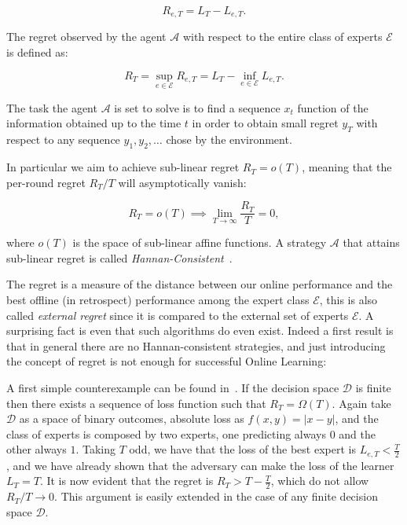 \begin{equation}\label{def:Regret}
	R_{e,T} = L_T-L_{e,T}.
\end{equation}

The regret observed by the agent $\mathcal A$ with respect to the entire class of experts $\mathcal E$ is defined as:

\begin{equation}
	R_T=\sup\limits_{e\in\mathcal E}R_{e,T}=L_T-\inf\limits_{e\in\mathcal E}L_{e,T}.
\end{equation}

The task the agent $\mathcal A$ is set to solve is to find a sequence $x_t$ function of the information obtained up to the time $t$ in order to obtain small regret $y_T$ with respect to any sequence $y_1,y_2,\ldots$ chose by the environment.

In particular we aim to achieve sub-linear regret $R_T= o(T)$, meaning that the per-round regret $R_T/T$ will asymptotically vanish: 

\begin{equation}
	R_T= o(T) \implies \lim\limits_{T\to \infty}\frac{R_T}{T}=0,
\end{equation}

where $ o(T)$ is the space of sub-linear affine functions. A strategy $\mathcal A$ that attains sub-linear regret is called \emph{Hannan-Consistent}~\cite{hannan1957approximation}.

The regret is a measure of the distance between our online performance and the best offline (in retrospect) performance among the expert class $\mathcal E$, this is also called \emph{external regret} since it is compared to the external set of experts $\mathcal E$. A surprising fact is even that such algorithms do even exist.
Indeed a first result is that in general there are no Hannan-consistent strategies, and just introducing the concept of regret is not enough for successful Online Learning: 

A first simple counterexample can be found in~\cite{cover1966behavior}. If the decision space $\mathcal D$ is finite then there exists a sequence of loss function such that $R_T=\Omega(T)$.
Again take $\mathcal D$ as a space of binary outcomes, absolute loss as $f(x,y)=|x - y|$, and the class of experts is composed by two experts, one predicting always $0$ and the other always $1$. Taking $T$ odd, we have that the loss of the best expert is $L_{e,T}<\frac{T}{2}$, and we have already shown that the adversary can make the loss of the learner $L_T=T$. It is now evident that the regret is $R_T>T-\frac{T}{2}$, which do not allow $R_T/T\to 0$. This argument is easily extended in the case of any finite decision space $\mathcal D$.

